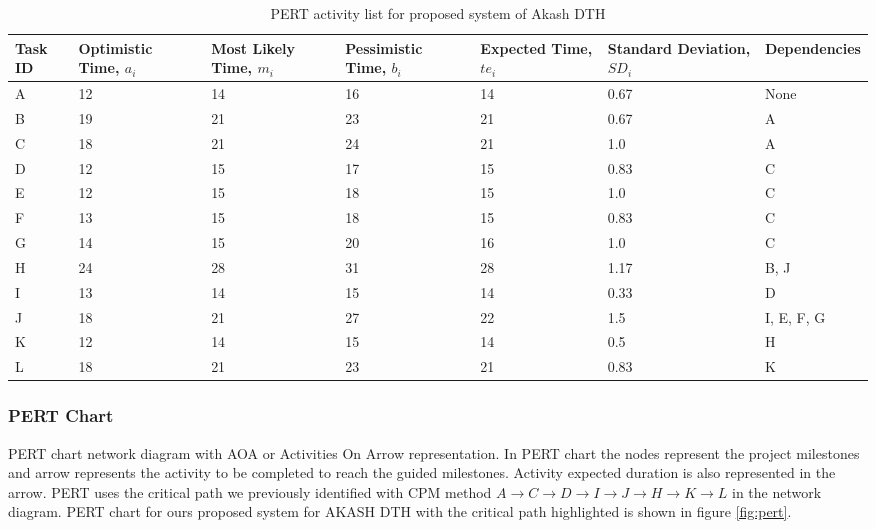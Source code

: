\begin{spacing}{1}
\begin{table}[h!]
	\begin{center}
		\begin{tabular}{| p{1cm} | p{2cm}| p{2cm} | p{2cm} | p{2cm} |p{2cm} | p{3cm} |}
			\hline
			Task ID  & Optimistic Time, $a_i$ &   Most Likely Time, $m_i$ & Pessimistic Time, $b_i$ & Expected Time, $te_i$ & Standard Deviation, $SD_i$ & Dependencies \\
			\hline
			A  & 12 & 14 & 16 & 14 & 0.67 & None \\
			\hline
			B  & 19 & 21 & 23 & 21  & 0.67 & A \\
			\hline
			C  & 18 & 21 & 24 & 21 & 1.0 & A \\
			\hline
			D  & 12 & 15  & 17 & 15 & 0.83 & C \\
			\hline
			E & 12 & 15 & 18 & 15 & 1.0 & C \\
			\hline
			F  & 13 & 15 & 18 & 15 & 0.83 & C \\
			\hline
			G  & 14 & 15 & 20 & 16 & 1.0  & C \\
			\hline
			H &  24 & 28 & 31 & 28 & 1.17 & B,  J \\
			\hline
			I  & 13 & 14 & 15 & 14 & 0.33 &  D \\
			\hline
			J  & 18 & 21 & 27 & 22 & 1.5  & I, E, F, G \\
			\hline
			K  & 12  & 14 & 15 & 14 & 0.5  & H \\
			\hline
			L  & 18 & 21 & 23 & 21 & 0.83 & K \\
			\hline    
		\end{tabular}
	\end{center}
	\caption{PERT activity list for proposed system of Akash DTH }
	\label{chart:PERT}
\end{table}

\subsubsection{PERT Chart}
PERT chart network diagram with AOA or Activities On Arrow representation. In PERT chart the nodes represent the project milestones and arrow represents the activity to be completed to reach the guided milestones.  Activity expected duration is also represented in the arrow. PERT uses the critical path we previously identified with CPM method $ A \to C \to D \to I \to J \to H \to K \to L $ in the network diagram. PERT chart for ours proposed system for AKASH DTH with the critical path highlighted is shown in figure \ref{fig:pert}.


\end{spacing}

